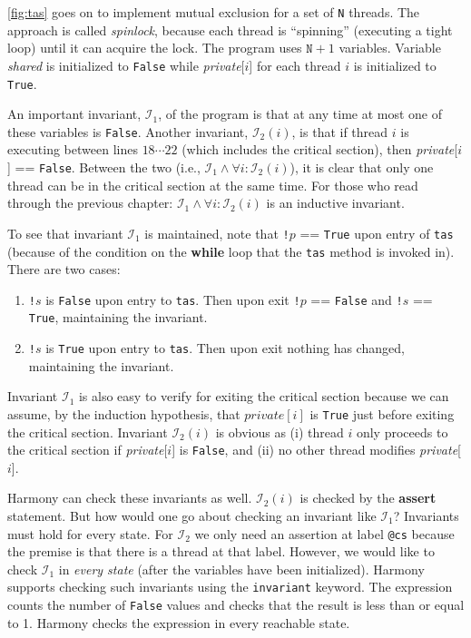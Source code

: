 \documentclass{report}
\begin{document}
\autoref{fig:tas} goes on to implement mutual exclusion for
a set of \texttt{N} threads.
The approach is called \emph{spinlock},
%
because each thread is ``spinning'' (executing a tight loop) until
it can acquire the lock.
The program uses $\mathtt{N}+1$ variables.
Variable \textit{shared} is initialized to \texttt{False} while
\textit{private}[$i$] for each thread $i$ is initialized to \texttt{True}.

An important invariant, $\mathcal{I}_1$, of the program is that at any time at most
one of these variables is \texttt{False}.
Another invariant, $\mathcal{I}_2(i)$, is that if thread $i$ is executing between
lines $18 \cdots 22$ (which includes the critical section),
then \textit{private}[$i$] == \texttt{False}.
Between the two (i.e., $\mathcal{I}_1 \land \forall i: \mathcal{I}_2(i)$),
it is clear that only one thread can be in the
critical section at the same time.
For those who read through the previous chapter:
$\mathcal{I}_1 \land \forall i: \mathcal{I}_2(i)$ is an inductive invariant.

To see that invariant $\mathcal{I}_1$ is maintained, note that
\texttt{!}$p$ == \texttt{True} upon entry of \texttt{tas}
(because of the condition on the \textbf{while} loop that the
\texttt{tas} method is invoked in).
There are two cases:
\begin{enumerate}
\item \texttt{!}$s$ is \texttt{False} upon entry to \texttt{tas}.
Then upon exit \texttt{!}$p$ == \texttt{False} and \texttt{!}$s$ == \texttt{True},
maintaining the invariant.
\item \texttt{!}$s$ is \texttt{True} upon entry to \texttt{tas}.
Then upon exit nothing has changed, maintaining the invariant.
\end{enumerate}
Invariant $\mathcal{I}_1$ is also easy to verify for exiting the critical section
because we can assume, by the induction hypothesis, that $\textit{private}[i]$ is
\texttt{True} just before exiting the critical section.
Invariant $\mathcal{I}_2(i)$ is obvious as (i) thread $i$ only proceeds to the critical
section if \textit{private}[$i$] is \texttt{False}, and (ii) no other thread modifies
\textit{private}[$i$].

Harmony can check these invariants as well.
$\mathcal{I}_2(i)$ is checked by the \textbf{assert} statement.
But how would one go about checking an
invariant like $\mathcal{I}_1$?  Invariants must hold for every state.
For $\mathcal{I}_2$ we only need an assertion at label \texttt{@cs} because the
premise is that there is a thread at that label.  However, we would
like to check $\mathcal{I}_1$ in \emph{every state} (after the variables have
been initialized).
Harmony supports checking such invariants using the \texttt{invariant}
keyword.
The expression counts the number of \texttt{False} values and checks that
the result is less than or equal to 1.
Harmony checks the expression in every reachable state.
\end{document}
